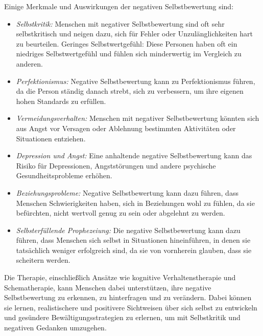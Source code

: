 Einige Merkmale und Auswirkungen der negativen Selbstbewertung sind:
\begin{itemize}
    \item \emph{Selbstkritik:} Menschen mit negativer Selbstbewertung sind oft sehr selbstkritisch und neigen dazu, sich für Fehler oder Unzulänglichkeiten hart zu beurteilen.
Geringes Selbstwertgefühl: Diese Personen haben oft ein niedriges Selbstwertgefühl und fühlen sich minderwertig im Vergleich zu anderen.
    \item \emph{Perfektionismus:} Negative Selbstbewertung kann zu Perfektionismus führen, da die Person ständig danach strebt, sich zu verbessern, um ihre eigenen hohen Standards zu erfüllen.
    \item \emph{Vermeidungsverhalten:} Menschen mit negativer Selbstbewertung könnten sich aus Angst vor Versagen oder Ablehnung bestimmten Aktivitäten oder Situationen entziehen.
    \item \emph{Depression und Angst:} Eine anhaltende negative Selbstbewertung kann das Risiko für Depressionen, Angststörungen und andere psychische Gesundheitsprobleme erhöhen.
    \item \emph{Beziehungsprobleme:} Negative Selbstbewertung kann dazu führen, dass Menschen Schwierigkeiten haben, sich in Beziehungen wohl zu fühlen, da sie befürchten, nicht wertvoll genug zu sein oder abgelehnt zu werden.
    \item \emph{Selbsterfüllende Prophezeiung:} Die negative Selbstbewertung kann dazu führen, dass Menschen sich selbst in Situationen hineinführen, in denen sie tatsächlich weniger erfolgreich sind, da sie von vornherein glauben, dass sie scheitern werden.
\end{itemize}
Die Therapie, einschließlich Ansätze wie kognitive Verhaltenstherapie und Schematherapie, kann Menschen dabei unterstützen, ihre negative Selbstbewertung zu erkennen, zu hinterfragen und zu verändern. Dabei können sie lernen, realistischere und positivere Sichtweisen über sich selbst zu entwickeln und gesündere Bewältigungsstrategien zu erlernen, um mit Selbstkritik und negativen Gedanken umzugehen.



